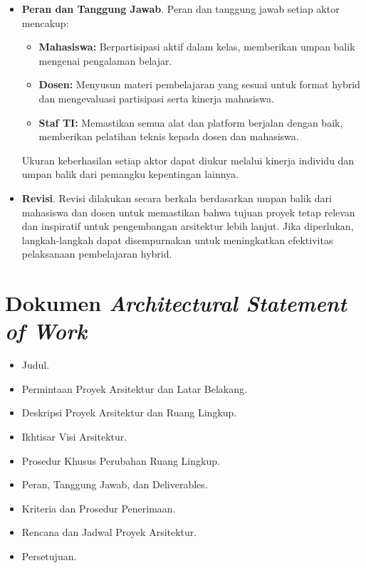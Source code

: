 \begin{itemize}
	\item \textbf{Peran dan Tanggung Jawab}. Peran dan tanggung jawab setiap aktor mencakup:
	\begin{itemize}
		\item \textbf{Mahasiswa:} Berpartisipasi aktif dalam kelas, memberikan umpan balik mengenai pengalaman belajar.
		\item \textbf{Dosen:} Menyusun materi pembelajaran yang sesuai untuk format hybrid dan mengevaluasi partisipasi serta kinerja mahasiswa.
		\item \textbf{Staf TI:} Memastikan semua alat dan platform berjalan dengan baik, memberikan pelatihan teknis kepada dosen dan mahasiswa.
	\end{itemize}
	Ukuran keberhasilan setiap aktor dapat diukur melalui kinerja individu dan umpan balik dari pemangku kepentingan lainnya.
	
	\item \textbf{Revisi}. Revisi dilakukan secara berkala berdasarkan umpan balik dari mahasiswa dan dosen untuk memastikan bahwa tujuan proyek tetap relevan dan inspiratif untuk pengembangan arsitektur lebih lanjut. Jika diperlukan, langkah-langkah dapat disempurnakan untuk meningkatkan efektivitas pelaksanaan pembelajaran hybrid.
\end{itemize}


\section{Dokumen \textit{Architectural Statement of Work}}
\label{sec:stament_of_work}
\begin{itemize}
	\item Judul.
	\item Permintaan Proyek Arsitektur dan Latar Belakang.
	\item Deskripsi Proyek Arsitektur dan Ruang Lingkup.
	\item Ikhtisar Visi Arsitektur.
	\item Prosedur Khusus Perubahan Ruang Lingkup.
	\item Peran, Tanggung Jawab, dan Deliverables.
	\item Kriteria dan Prosedur Penerimaan.
	\item Rencana dan Jadwal Proyek Arsitektur.
	\item Persetujuan.
\end{itemize}

